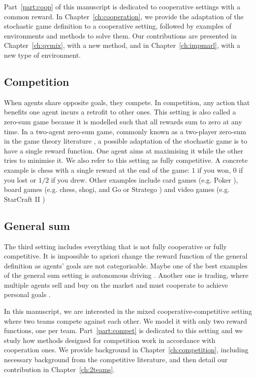 Part~\ref{part:coop} of this manuscript is dedicated to cooperative settings with a common reward.
In Chapter~\ref{ch:cooperation}, we provide the adaptation of the stochastic game definition to a cooperative setting, followed by examples of environments and methods to solve them.
Our contributions are presented in Chapter~\ref{ch:qvmix}, with a new method, and in Chapter~\ref{ch:impmarl}, with a new type of environment.

\subsection{Competition} 
\label{sec:ch2_Competition}
When agents share opposite goals, they compete.
In competition, any action that benefits one agent incurs a retrofit to other ones.
This setting is also called a zero-sum game \citep{marl-book} because it is modelled such that all rewards sum to zero at any time.
In a two-agent zero-sum game, commonly known as a two-player zero-sum in the game theory literature \citep{russel2010}, a possible adaptation of the stochastic game is to have a single reward function.
One agent aims at maximising it while the other tries to minimise it.
We also refer to this setting as fully competitive.
A concrete example is chess with a single reward at the end of the game: $1$ if you won, $0$ if you lost or $1/2$ if you drew.
Other examples include card games (e.g. Poker \citep{poker}), board games (e.g. chess, shogi, and Go \citep{silver2018general} or Stratego \citep{stratego}) and video games (e.g. StarCraft II \citep{vinyals2019grandmaster})


\subsection{General sum} 
\label{sec:ch2_general_sum}
The third setting includes everything that is not fully cooperative or fully competitive.
It is impossible to apriori change the reward function of the general definition as agents' goals are not categorisable.
Maybe one of the best examples of the general sum setting is autonomous driving \citep{dinneweth2022multi}.
Another one is trading, where multiple agents sell and buy on the market and must cooperate to achieve personal goals \citep{SHAVANDI2022118124}.

In this manuscript, we are interested in the mixed cooperative-competitive setting where two teams compete against each other.
We model it with only two reward functions, one per team.
Part~\ref{part:compet} is dedicated to this setting and we study how methods designed for competition work in accordance with cooperation ones.
We provide background in Chapter~\ref{ch:competition}, including necessary background from the competitive literature, and then detail our contribution in Chapter~\ref{ch:2teams}.


